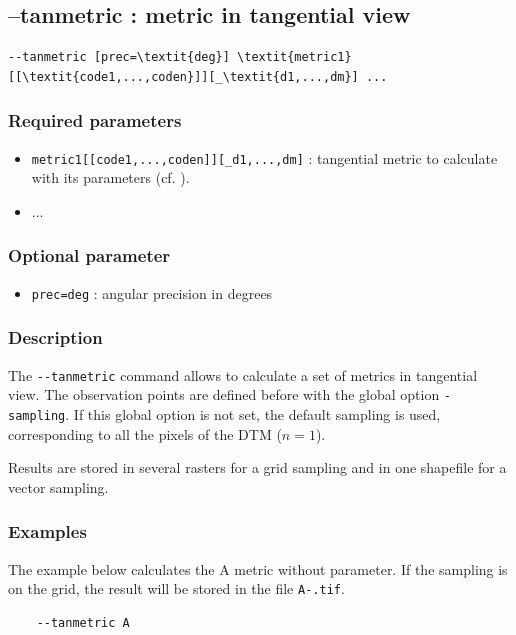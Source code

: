 \documentclass{report}
\begin{document}
\subsection{--tanmetric : metric in tangential view}
\begin{Verbatim}[commandchars=\\\{\}]
--tanmetric [prec=\textit{deg}] \textit{metric1}[[\textit{code1,...,coden}]][_\textit{d1,...,dm}] ...
\end{Verbatim}

\subsubsection{Required parameters}
\begin{itemize}
	\item \verb|metric1[[code1,...,coden]][_d1,...,dm]| : tangential metric to calculate with its parameters (cf. ).
	\item ...
\end{itemize}

\subsubsection{Optional parameter}
\begin{itemize}
	\item \verb|prec=deg| : angular precision in degrees
\end{itemize}

\subsubsection{Description}
The \verb|--tanmetric| command allows to calculate a set of metrics in tangential view. The observation points are defined before with the global option \verb|-sampling|. 
If this global option is not set, the default sampling is used, corresponding to all the pixels of the DTM ($n=1$).

Results are stored in several rasters for a grid sampling and in one shapefile for a vector sampling.


\subsubsection{Examples}

The example below calculates the A metric without parameter. If the sampling is on the grid, the result will be stored in the file \verb|A-.tif|.
\begin{Verbatim}
	--tanmetric A
\end{Verbatim}
\end{document}
